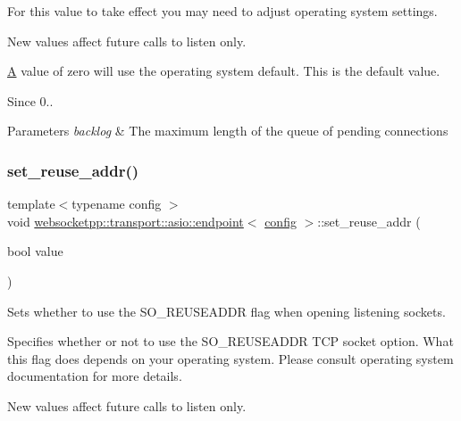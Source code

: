 For this value to take effect you may need to adjust operating system settings.

New values affect future calls to listen only.

\mbox{\hyperlink{struct_a}{A}} value of zero will use the operating system default. This is the default value.

\begin{DoxySince}{Since}
0..
\end{DoxySince}

\begin{DoxyParams}{Parameters}
{\em backlog} & The maximum length of the queue of pending connections \\
\hline
\end{DoxyParams}
\mbox{\label{classwebsocketpp_1_1transport_1_1asio_1_1endpoint_a491d13d6e1ad0edc5843e41b06fa4e0c}} 
\subsubsection{\texorpdfstring{set\+\_\+reuse\+\_\+addr()}{set\_reuse\_addr()}}
{\footnotesize\ttfamily template$<$typename config $>$ \\
void \mbox{\hyperlink{classwebsocketpp_1_1transport_1_1asio_1_1endpoint}{websocketpp\+::transport\+::asio\+::endpoint}}$<$ \mbox{\hyperlink{classconfig}{config}} $>$\+::set\+\_\+reuse\+\_\+addr (\begin{DoxyParamCaption}\item[{bool}]{value }\end{DoxyParamCaption})\hspace{0.3cm}{\ttfamily [inline]}}



Sets whether to use the S\+O\+\_\+\+R\+E\+U\+S\+E\+A\+D\+DR flag when opening listening sockets. 

Specifies whether or not to use the S\+O\+\_\+\+R\+E\+U\+S\+E\+A\+D\+DR T\+CP socket option. What this flag does depends on your operating system. Please consult operating system documentation for more details.

New values affect future calls to listen only.

